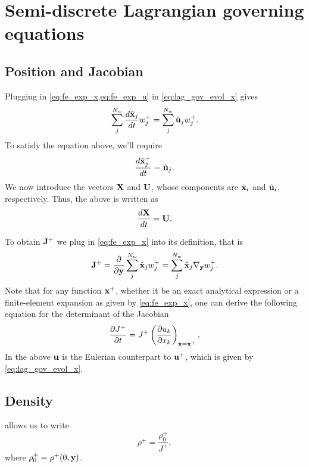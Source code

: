 \documentclass[11pt]{report}
\begin{document}
\section{Semi-discrete Lagrangian governing equations}
\subsection{Position and Jacobian}
Plugging in \cref{eq:fe_exp_x,eq:fe_exp_u} in \cref{eq:lag_gov_evol_x} gives
\begin{equation}
    \sum_{j}^{N_w} \frac{d \hat{\mathbf{x}}_j}{dt} w^+_j = \sum_{j}^{N_w} \hat{\mathbf{u}}_j w^+_j.
\end{equation}
To satisfy the equation above, we'll require
\begin{equation}
    \frac{d \hat{\mathbf{x}}^+_j}{dt} = \hat{\mathbf{u}}_j.
\end{equation}
We now introduce the vectors $\mathbf{X}$ and $\mathbf{U}$, whose components are $\hat{\mathbf{x}}_i$ and $\hat{\mathbf{u}}_i$, respectively. Thus, the above is written as
\begin{equation}
    \label{eq:evol_x_semi_discrete}
    \frac{d\mathbf{X}}{dt} = \mathbf{U}.
\end{equation}

To obtain $\mathbf{J}^+$ we plug in \cref{eq:fe_exp_x} into its definition, that is
\begin{equation}
    \mathbf{J}^+ = \frac{\partial}{\partial \mathbf{y}} \sum_j^{N_w} \hat{\mathbf{x}}_j w^+_j = \sum_j^{N_w} \hat{\mathbf{x}}_j \nabla_{\mathbf{y}} w^+_j.
\end{equation}
Note that for any function $\mathbf{x}^+$, whether it be an exact analytical expression or a finite-element expansion as given by \cref{eq:fe_exp_x}, one can derive the following equation for the determinant of the Jacobian 
\begin{equation}
    \frac{\partial J^+}{\partial t} = J^+ \left ( \frac{\partial u_k}{\partial x_k} \right )_{\mathbf{x} = \mathbf{x}^+},
\end{equation}
In the above $\mathbf{u}$ is the Eulerian counterpart to $\mathbf{u}^+$, which is given by \cref{eq:lag_gov_evol_x}.

\subsection{Density}
 allows us to write
\begin{equation}
    \label{eq:evol_rho_semi_discrete}
    \rho^+ = \frac{\rho^+_0}{J^+},
\end{equation}
where $\rho^+_0 = \rho^+(0,\mathbf{y})$.
\end{document}

